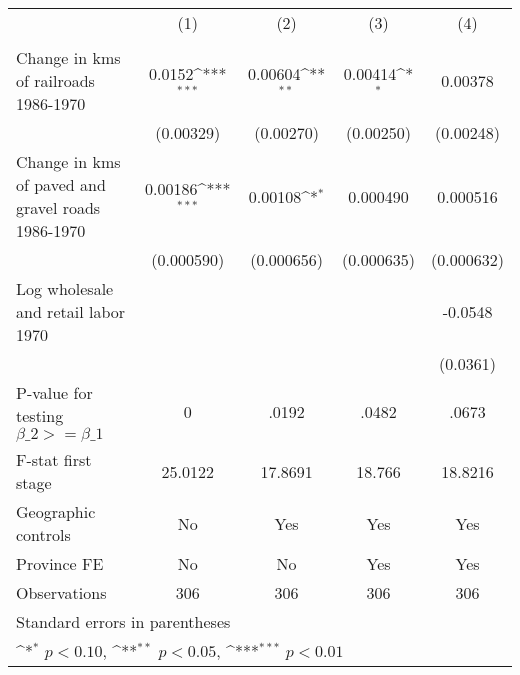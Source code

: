 {
\def\sym#1{\ifmmode^{#1}\else\(^{#1}\)\fi}
\begin{tabular}{l*{4}{c}}
\hline\hline
                &\multicolumn{1}{c}{(1)}&\multicolumn{1}{c}{(2)}&\multicolumn{1}{c}{(3)}&\multicolumn{1}{c}{(4)}\\
                &\multicolumn{1}{c}{}&\multicolumn{1}{c}{}&\multicolumn{1}{c}{}&\multicolumn{1}{c}{}\\
\hline
Change in kms of railroads 1986-1970&   0.0152\sym{***}&  0.00604\sym{**} &  0.00414\sym{*}  &  0.00378         \\
                &(0.00329)         &(0.00270)         &(0.00250)         &(0.00248)         \\
[1em]
Change in kms of paved and gravel roads 1986-1970&  0.00186\sym{***}&  0.00108\sym{*}  & 0.000490         & 0.000516         \\
                &(0.000590)         &(0.000656)         &(0.000635)         &(0.000632)         \\
[1em]
Log wholesale and retail labor 1970&                  &                  &                  &  -0.0548         \\
                &                  &                  &                  & (0.0361)         \\
\hline
P-value for testing $\beta\_{2} >= \beta\_{1}$&        0         &    .0192         &    .0482         &    .0673         \\
F-stat first stage&  25.0122         &  17.8691         &   18.766         &  18.8216         \\
Geographic controls&       No         &      Yes         &      Yes         &      Yes         \\
Province FE     &       No         &       No         &      Yes         &      Yes         \\
Observations    &      306         &      306         &      306         &      306         \\
\hline\hline
\multicolumn{5}{l}{\footnotesize Standard errors in parentheses}\\
\multicolumn{5}{l}{\footnotesize \sym{*} \(p<0.10\), \sym{**} \(p<0.05\), \sym{***} \(p<0.01\)}\\
\end{tabular}
}
